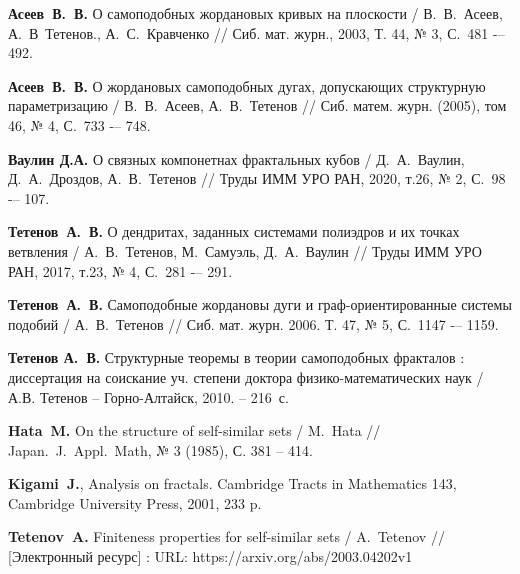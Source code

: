 \newpage




\begin{thebibliography}{99}
{\bf Асеев~В.~В.} 
О самоподобных жордановых кривых на плоскости / 
В.~В.~Асеев, А.~В~Тетенов., А.~С.~Кравченко //
Сиб. мат. журн., 2003, Т. 44, № 3, С.~481 -– 492.

{\bf Асеев~В.~В.} 
О жордановых самоподобных дугах, допускающих структурную параметризацию /
В.~В.~Асеев, А.~В.~Тетенов //
Сиб. матем. журн. (2005), том 46, № 4, С.~733 -– 748.

{\bf Ваулин Д.А.}
О связных компонетнах фрактальных кубов / 
Д.~А.~Ваулин, Д.~А.~Дроздов, А.~В.~Тетенов //
Труды ИММ УРО РАН, 2020, т.26, № 2, С.~98 -– 107.

{\bf Тетенов~А.~В.}  
О дендритах, заданных системами полиэдров и их точках ветвления /
А.~В.~Тетенов, М.~Самуэль, Д.~А.~Ваулин // 
Труды ИММ УРО РАН, 2017, т.23, № 4, С.~281 -– 291.

{\bf Тетенов~А.~В.}
Самоподобные жордановы дуги и граф-ориентированные системы подобий /
А.~В.~Тетенов //
Сиб. мат. журн. 2006. Т. 47, № 5, С.~1147 -– 1159.

{\bf Тетенов А.~В.} 
Структурные теоремы в теории самоподобных фракталов : диссертация на соискание уч. степени доктора физико-математических наук / А.В. Тетенов -- Горно-Алтайск, 2010. -- 216~с. 

{\bf Hata~M.}  
On the structure of self-similar sets /
M.~Hata //
Japan.~J.~Appl.~Math, № 3 (1985), С. 381 -- 414.

{\bf Kigami~J.}, 
Analysis on fractals. Cambridge Tracts in Mathematics 143, 
Cambridge University Press, 2001, 233 p.

{\bf Tetenov~A.}
Finiteness properties for self-similar sets /
A.~Tetenov //
[Электронный ресурс] : URL: https://arxiv.org/abs/2003.04202v1


\end{thebibliography}

